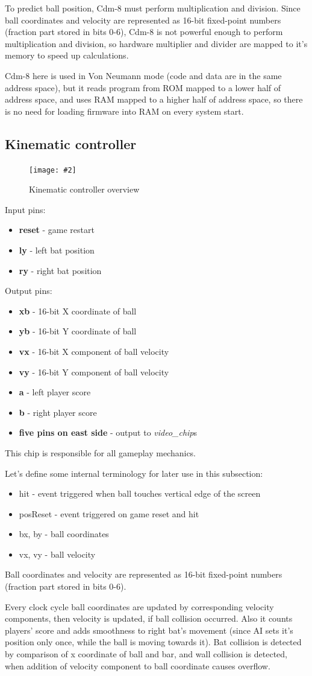 \documentclass[12pt,a4paper]{article}
\newcommand{\dofigure}[3][H]{
    \begin{figure}[#1]
        \centering
        \texttt{[image: \#2]}
        \caption{#3}
    \end{figure}
}
\newcommand{\chip}[1]{{\itshape#1}}
\newcommand{\pin}[1]{\textbf{#1}}
\newenvironment{pins}{
    
    \let\oldpin\pin
    \renewcommand{\pin}[1]{\item\oldpin{##1}}
    \newcommand{\inputs}[1]{
        
    Input pins:\begin{itemize}##1\end{itemize}}
    \newcommand{\outputs}[1]{
        
    Output pins:\begin{itemize}##1\end{itemize}}
}{}
\begin{document}
    To predict ball position, Cdm-8 must perform multiplication and division.
    Since ball coordinates and velocity are represented as 16-bit fixed-point numbers (fraction part stored in bits 0-6), Cdm-8 is not powerful enough to perform multiplication and division, so hardware multiplier and divider are mapped to it's memory to speed up calculations.

    Cdm-8 here is used in Von Neumann mode (code and data are in the same address space), but it reads program from ROM mapped to a lower half of address space, and uses RAM mapped to a higher half of address space, so there is no need for loading firmware into RAM on every system start.

    


    \subsection{Kinematic controller}
    \dofigure{kinematic_overview}{Kinematic controller overview}
    \begin{pins}
        \inputs{
            \pin{reset} - game restart
            \pin{ly} - left bat position
            \pin{ry} - right bat position
        }
        \outputs{
            \pin{xb} - 16-bit X coordinate of ball
            \pin{yb} - 16-bit Y coordinate of ball
            \pin{vx} - 16-bit X component of ball velocity
            \pin{vy} - 16-bit Y component of ball velocity
            \pin{a} - left player score
            \pin{b} - right player score
            \pin{five pins on east side} - output to \chip{video\_chip}s
        }
    \end{pins}
    This chip is responsible for all gameplay mechanics.

    Let's define some internal terminology for later use in this subsection:\begin{itemize}
        \item hit - event triggered when ball touches vertical edge of the screen
        \item posReset - event triggered on game reset and hit
        \item bx, by - ball coordinates
        \item vx, vy - ball velocity
    \end{itemize}
    Ball coordinates and velocity are represented as 16-bit fixed-point numbers (fraction part stored in bits 0-6).


    Every clock cycle  ball coordinates are updated by corresponding velocity components, then velocity is updated, if ball collision occurred. Also it counts players' score and adds smoothness to right bat's movement (since AI sets it's position only once, while the ball is moving towards it). Bat collision is detected by comparison of x coordinate of ball and bar, and wall collision is detected, when addition of velocity component to ball coordinate causes overflow.
    
\end{document}
